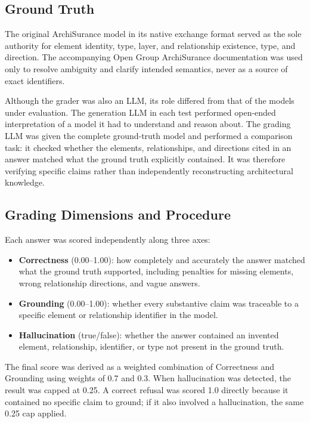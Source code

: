 \subsection{Ground Truth}
\label{subsec:ai-ground-truth}

The original ArchiSurance model in its native exchange format served as the sole authority for element identity, type, layer, and relationship existence, type, and direction. The accompanying Open Group ArchiSurance documentation was used only to resolve ambiguity and clarify intended semantics, never as a source of exact identifiers.

Although the grader was also an LLM, its role differed from that of the models under evaluation. The generation LLM in each test performed open-ended interpretation of a model it had to understand and reason about. The grading LLM was given the complete ground-truth model and performed a comparison task: it checked whether the elements, relationships, and directions cited in an answer matched what the ground truth explicitly contained. It was therefore verifying specific claims rather than independently reconstructing architectural knowledge.

\subsection{Grading Dimensions and Procedure}
\label{subsec:ai-grading}

Each answer was scored independently along three axes:
\begin{itemize}
    \item \textbf{Correctness} (0.00--1.00): how completely and accurately the answer matched what the ground truth supported, including penalties for missing elements, wrong relationship directions, and vague answers.
    \item \textbf{Grounding} (0.00--1.00): whether every substantive claim was traceable to a specific element or relationship identifier in the model.
    \item \textbf{Hallucination} (true/false): whether the answer contained an invented element, relationship, identifier, or type not present in the ground truth.
\end{itemize}

The final score was derived as a weighted combination of Correctness and Grounding using weights of 0.7 and 0.3. When hallucination was detected, the result was capped at 0.25. A correct refusal was scored 1.0 directly because it contained no specific claim to ground; if it also involved a hallucination, the same 0.25 cap applied.

